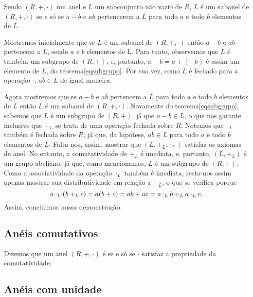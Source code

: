 \begin{Teo}\label{teosubanel}
  Sendo $(R,+,\cdot)$ um anel e $L$ um subconjunto não vazio de $R$, $L$
  é um subanel de $(R,+,\cdot)$ se e só se $a-b$ e $ab$ pertencerem a
  $L$
  para todo $a$ e todo $b$ elementos de $L$.
\end{Teo}

\begin{dem}
  Mostremos inicialmente que se $L$ é um subanel de $(R,+,\cdot)$
  então $a-b$ e $ab$
  pertencem a $L$, sendo $a$ e $b$ elementos de L.
  Para tanto, observemos que $L$ é também um subgrupo
  de $(R,+)$, e, portanto, $a-b = a+(-b)$ é assim um elemento de
  $L$, do teorema\xspace\ref{eqsubgrupo}.
  Por sua vez, como $L$ é fechado para a operação $\cdot$, $ab\in
  L$ de igual maneira.

  Agora mostremos que se $a-b$ e $ab$ pertencem a $L$
  para todo $a$ e todo $b$ elementos de $L$
  então $L$ é um
  subanel de $(R,+,\cdot)$.
  Novamente do teorema\xspace\ref{eqsubgrupo},
  sabemos que $L$ é um subgrupo de $(R,+)$, já que $a-b\in
  L$, o que nos garante inclusive que $+_L$ se trata de uma operação
  fechada sobre $R$.
  Notemos que $\cdot_L$ também é fechada
  sobre $R$, já que, da hipótese,
  $ab\in L$ para todo $a$ e todo $b$ elementos de
  $L$. Falta-nos, assim, mostrar que $(L,+_L,\cdot_L)$ satisfaz os
  axiomas de anel. No entanto,
  a comutatividade de $+_L$ é imediata, e,
  portanto, $(L,+_L)$ é um grupo abeliano, já que, como mencionamos,
  $L$ é um subgrupo de $(R,+)$.
  Como a associatividade da operação $\cdot_L$ também é imediata,
  resta-nos
  assim apenas mostrar sua distributividade em relação a $+_L$, o que
  se verifica porque
  \begin{equation*}
    a\cdot_L(b+_Lc) = a(b+c) = ab + ac =
    a\cdot_Lb +_L a\cdot_Lc\mathrm{.}
  \end{equation*}
  Assim, concluimos nossa demonstração.
\end{dem}

\subsection{Anéis comutativos}

\begin{Def}
  Dizemos que um anel $(R,+,\cdot)$ é  se e só se $\cdot$ satisfaz a propriedade da
  comutatividade.
\end{Def}

\subsection{Anéis com unidade}

